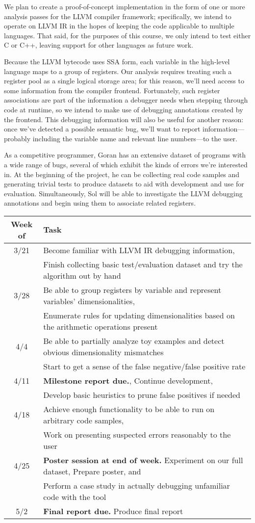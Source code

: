 \documentclass[12pt]{article}
\begin{document}
We plan to create a proof-of-concept implementation in the form of one or more analysis passes for the LLVM compiler framework; specifically, we intend to operate on LLVM IR in the hopes of keeping the code applicable to multiple languages.
That said, for the purposes of this course, we only intend to test either C or C++, leaving support for other languages as future work.

Because the LLVM bytecode uses SSA form, each variable in the high-level language maps to a group of registers.
Our analysis requires treating such a register pool as a single logical storage area; for this reason, we'll need access to some information from the compiler frontend.
Fortunately, such register associations are part of the information a debugger needs when stepping through code at runtime, so we intend to make use of debugging annotations created by the frontend.
This debugging information will also be useful for another reason: once we've detected a possible semantic bug, we'll want to report information---probably including the variable name and relevant line numbers---to the user.

As a competitive programmer, Goran has an extensive dataset of programs with a wide range of bugs, several of which exhibit the kinds of errors we're interested in.
At the beginning of the project, he can be collecting real code samples and generating trivial tests to produce datasets to aid with development and use for evaluation.
Simultaneously, Sol will be able to investigate the LLVM debugging annotations and begin using them to associate related registers.

\noindent
\begin{tabular}{c | l}
Week of & Task \\
\hline
3/21 & Become familiar with LLVM IR debugging information, \\
& Finish collecting basic test/evaluation dataset and try the algorithm out by hand \\
3/28 & Be able to group registers by variable and represent variables' dimensionalities, \\
& Enumerate rules for updating dimensionalities based on the arithmetic operations present \\
4/4 & Be able to partially analyze toy examples and detect obvious dimensionality mismatches \\
& Start to get a sense of the false negative/false positive rate \\
4/11 & \textbf{Milestone report due.}, Continue development, \\
& Develop basic heuristics to prune false positives if needed \\
4/18 & Achieve enough functionality to be able to run on arbitrary code samples, \\
& Work on presenting suspected errors reasonably to the user \\
4/25 & \textbf{Poster session at end of week.} Experiment on our full dataset, Prepare poster, and \\
& Perform a case study in actually debugging unfamiliar code with the tool \\
5/2 & \textbf{Final report due.} Produce final report
\end{tabular}
\end{document}
